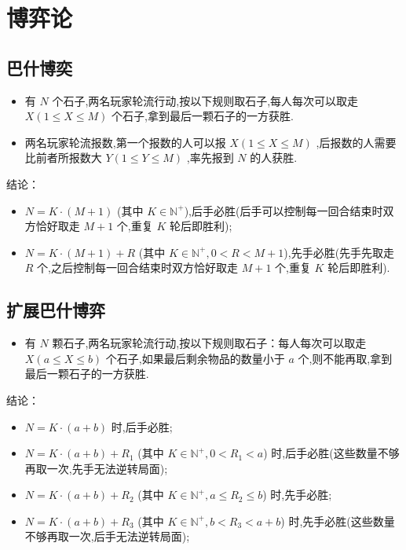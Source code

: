 \section{博弈论}
\subsection{巴什博奕}
\begin{itemize}
    \item 有 $N$ 个石子,两名玩家轮流行动,按以下规则取石子,每人每次可以取走 $X(1 \le X \le M)$ 个石子,拿到最后一颗石子的一方获胜.

    \item 两名玩家轮流报数,第一个报数的人可以报 $X(1 \le X \le M)$ ,后报数的人需要比前者所报数大 $Y(1 \le Y \le M)$ ,率先报到 $N$ 的人获胜.

\end{itemize}

结论：
\begin{itemize}
    \item $N=K\cdot(M+1)$ (其中 $K \in \mathbb{N}^+$),后手必胜(后手可以控制每一回合结束时双方恰好取走 $M+1$ 个,重复 $K$ 轮后即胜利);
    \item $N=K\cdot(M+1)+R$ (其中 $K \in \mathbb{N}^+,0 < R < M + 1$),先手必胜(先手先取走 $R$ 个,之后控制每一回合结束时双方恰好取走 $M+1$ 个,重复 $K$ 轮后即胜利).
\end{itemize}


\subsection{扩展巴什博弈}
\begin{itemize}
    \item 有 $N$ 颗石子,两名玩家轮流行动,按以下规则取石子：每人每次可以取走 $X(a \le X \le b)$ 个石子,如果最后剩余物品的数量小于 $a$ 个,则不能再取,拿到最后一颗石子的一方获胜.
\end{itemize}

结论：
\begin{itemize}
    \item $N = K\cdot(a+b)$ 时,后手必胜;
    \item $N = K\cdot(a+b)+R_1$ (其中 $K \in \mathbb{N}^+,0 < R_1 < a$) 时,后手必胜(这些数量不够再取一次,先手无法逆转局面);
    \item $N = K\cdot(a+b)+R_2$ (其中 $K \in \mathbb{N}^+,a \le R_2 \le b$) 时,先手必胜;
    \item $N = K\cdot(a+b)+R_3$ (其中 $K \in \mathbb{N}^+,b < R_3 < a + b$) 时,先手必胜(这些数量不够再取一次,后手无法逆转局面);
\end{itemize}


